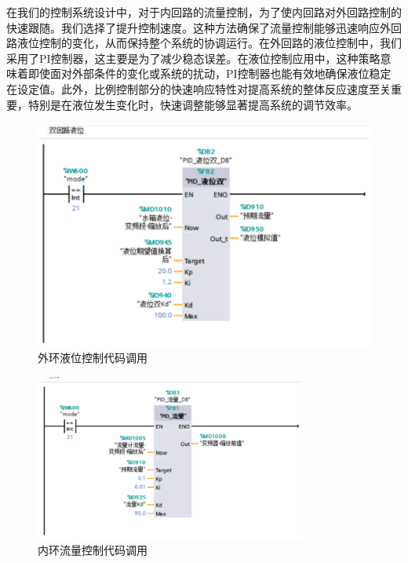 \documentclass[UTF8]{article}
\begin{document}
在我们的控制系统设计中，对于内回路的流量控制，为了使内回路对外回路控制的快速跟随。我们选择了提升控制速度。这种方法确保了流量控制能够迅速响应外回路液位控制的变化，从而保持整个系统的协调运行。在外回路的液位控制中，我们采用了PI控制器，这主要是为了减少稳态误差。在液位控制应用中，这种策略意味着即使面对外部条件的变化或系统的扰动，PI控制器也能有效地确保液位稳定在设定值。此外，比例控制部分的快速响应特性对提高系统的整体反应速度至关重要，特别是在液位发生变化时，快速调整能够显著提高系统的调节效率。
\begin{figure}[H]
    \centering %
    \includegraphics[width=.8\textwidth]{figure/串级-外环液位-手写-调用.PNG} 
    \caption{外环液位控制代码调用} %
\end{figure}
\begin{figure}[H]
    \centering %
    \includegraphics[width=0.8\textwidth]{figure/串级-内环流量-手写-调用.PNG} 
    \caption{内环流量控制代码调用} %
\end{figure}
\end{document}
